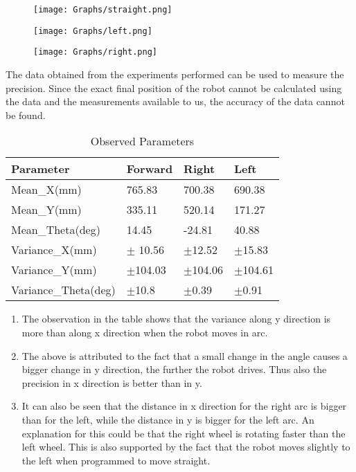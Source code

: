 \documentclass[10pt,a4paper]{article}
\begin{document}
\begin{figure}[H]
	\centering
	\texttt{[image: Graphs/straight.png]}
\end{figure}

\begin{figure}[H]
	\centering
	\texttt{[image: Graphs/left.png]}
\end{figure}

\begin{figure}[H]
	\centering
	\texttt{[image: Graphs/right.png]}
\end{figure}



The data obtained from the experiments performed can be used to measure the precision.
Since the exact final position of the robot cannot be calculated using the data and the measurements available to us, the accuracy of the data cannot be found.

\begin{table}[ht]				
	\centering
	\begin{tabular}{ | C{3cm} | C{3cm}|  C{3cm} | C{3cm} |} 
		\hline
		\textbf{Parameter} & \textbf{Forward} & \textbf{Right} & \textbf{Left}\\ 
		\hline
		Mean\_X(mm)  & 765.83 & 700.38 & 690.38  \\ 
		\hline
		Mean\_Y(mm)  & 335.11 & 520.14 & 171.27  \\  
		\hline
		Mean\_Theta(deg)  & 14.45 & -24.81 & 40.88  \\ 
		\hline
		Variance\_X(mm)  & $\pm$ 10.56 & $\pm$12.52 & $\pm$15.83 \\  
		\hline
		Variance\_Y(mm)  & $\pm$104.03 & $\pm$104.06 & $\pm$104.61  \\ 
		\hline
		Variance\_Theta(deg)  & $\pm$10.8 & $\pm$0.39 & $\pm$0.91  \\  
		\hline
	\end{tabular}
	\caption{Observed Parameters}
	\label{Tab:Tcr}
\end{table}

\begin{enumerate}
	\item
	The observation in the table shows that the variance along y direction is more than along x direction when the robot moves in arc.
	\item
	The above is attributed to the fact that a small change in the angle
	causes a bigger change in y direction, the further the robot drives.
	Thus also the precision in x direction is better than in y.
	\item
	It can also be seen that the distance in x direction for the right arc
	is bigger than for the left, while the distance in y is bigger for the
	left arc. An explanation for this could be that the right wheel is rotating faster than the left wheel. This is also supported by the fact that the robot moves slightly to the left when programmed to move straight.
\end{enumerate}
\end{document}
